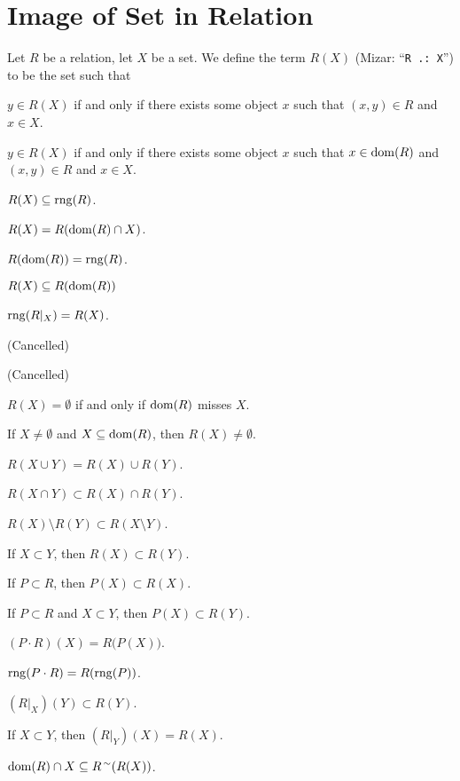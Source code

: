 \documentclass{article}
\begin{document}
\section{Image of Set in Relation}

\begin{definition}
Let $R$ be a relation, let $X$ be a set.
We define the term $R(X)$ (Mizar: ``\verb#R .: X#'') to be the set such
that
\begin{defn}
\item $y\in R(X)$ if and only if there exists some object $x$ such that
  $(x,y)\in R$ and $x\in X$.
\end{defn}
\end{definition}

\begin{thm}
\item\label{relat1:110} $y\in R(X)$ if and only if there exists some
  object $x$ such that $x\in\operatorname{dom}(R)$ and $(x,y)\in R$ and $x\in X$.
\item\label{relat1:111} $R(X)\subseteq\operatorname{rng}(R)$.
\item\label{relat1:112} $R(X)=R(\operatorname{dom}(R)\cap X)$.
\item\label{relat1:113} $R(\operatorname{dom}(R))=\operatorname{rng}(R)$.
\item\label{relat1:114} $R(X)\subseteq R(\operatorname{dom}(R))$
\item\label{relat1:115} $\operatorname{rng}(R|_{X})=R(X)$.
\item\label{relat1:116} (Cancelled)
\item\label{relat1:117} (Cancelled)
\item\label{relat1:118} $R(X)=\emptyset$ if and only if $\operatorname{dom}(R)$ misses $X$.
\item\label{relat1:119} If $X\neq\emptyset$ and $X\subseteq\operatorname{dom}(R)$, then $R(X)\neq\emptyset$.
\item\label{relat1:120} $R(X\cup Y)=R(X)\cup R(Y)$.
\item\label{relat1:121} $R(X\cap Y)\subset R(X)\cap R(Y)$.
\item\label{relat1:122} $R(X)\setminus R(Y)\subset R(X\setminus Y)$.
\item\label{relat1:123} If $X\subset Y$, then $R(X)\subset R(Y)$.
\item\label{relat1:124} If $P\subset R$, then $P(X)\subset R(X)$.
\item\label{relat1:125} If $P\subset R$ and $X\subset Y$, then
  $P(X)\subset R(Y)$.
\item\label{relat1:126} $(P\cdot R)(X)=R\bigl(P(X)\bigr)$.
\item\label{relat1:127} $\operatorname{rng}(P\cdot R)=R(\operatorname{rng}(P))$.
\item\label{relat1:128} $(R|_{X})(Y)\subset R(Y)$.
\item\label{relat1:129} If $X\subset Y$, then $(R|_{Y})(X)=R(X)$.
\item\label{relat1:130} $\operatorname{dom}(R)\cap X\subseteq R^{\,\sim}(R(X))$.
\end{thm}
\end{document}
